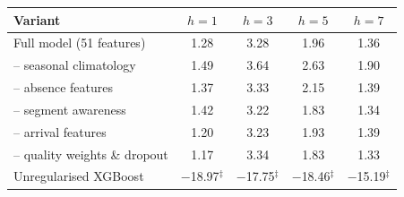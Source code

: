 \begin{tabular}{lcccc}
\toprule
Variant & $h{=}1$ & $h{=}3$ & $h{=}5$ & $h{=}7$\\
\midrule
Full model (51 features) & 1.28 & 3.28 & 1.96 & 1.36\\
-- seasonal climatology & 1.49 & 3.64 & 2.63 & 1.90\\
-- absence features & 1.37 & 3.33 & 2.15 & 1.39\\
-- segment awareness & 1.42 & 3.22 & 1.83 & 1.34\\
-- arrival features & 1.20 & 3.23 & 1.93 & 1.39\\
-- quality weights \& dropout & 1.17 & 3.34 & 1.83 & 1.33\\
Unregularised XGBoost & $-$18.97$^{\ddagger}$ & $-$17.75$^{\ddagger}$ & $-$18.46$^{\ddagger}$ & $-$15.19$^{\ddagger}$\\
\bottomrule
\end{tabular}
